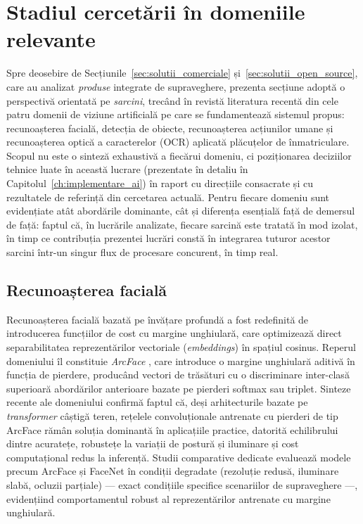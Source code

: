 \documentclass[../../main.tex]{subfiles}
\begin{document}
\section{Stadiul cercetării în domeniile relevante}
\label{sec:stadiul_cercetarii}

Spre deosebire de Secțiunile~\ref{sec:solutii_comerciale} și~\ref{sec:solutii_open_source}, care au analizat \emph{produse} integrate de supraveghere, prezenta secțiune adoptă o perspectivă orientată pe \emph{sarcini}, trecând în revistă literatura recentă din cele patru domenii de viziune artificială pe care se fundamentează sistemul propus: recunoașterea facială, detecția de obiecte, recunoașterea acțiunilor umane și recunoașterea optică a caracterelor (OCR) aplicată plăcuțelor de înmatriculare. Scopul nu este o sinteză exhaustivă a fiecărui domeniu, ci poziționarea deciziilor tehnice luate în această lucrare (prezentate în detaliu în Capitolul~\ref{ch:implementare_ai}) în raport cu direcțiile consacrate și cu rezultatele de referință din cercetarea actuală. Pentru fiecare domeniu sunt evidențiate atât abordările dominante, cât și diferența esențială față de demersul de față: faptul că, în lucrările analizate, fiecare sarcină este tratată în mod izolat, în timp ce contribuția prezentei lucrări constă în integrarea tuturor acestor sarcini într-un singur flux de procesare concurent, în timp real.

\subsection{Recunoașterea facială}
\label{subsec:cercetare_facial}

Recunoașterea facială bazată pe învățare profundă a fost redefinită de introducerea funcțiilor de cost cu margine unghiulară, care optimizează direct separabilitatea reprezentărilor vectoriale (\emph{embeddings}) în spațiul cosinus. Reperul domeniului îl constituie \emph{ArcFace} \cite{arcface2019}, care introduce o margine unghiulară aditivă în funcția de pierdere, producând vectori de trăsături cu o discriminare inter-clasă superioară abordărilor anterioare bazate pe pierderi softmax sau triplet. Sinteze recente ale domeniului \cite{facerec_review2024} confirmă faptul că, deși arhitecturile bazate pe \emph{transformer} câștigă teren, rețelele convoluționale antrenate cu pierderi de tip ArcFace rămân soluția dominantă în aplicațiile practice, datorită echilibrului dintre acuratețe, robustețe la variații de postură și iluminare și cost computațional redus la inferență. Studii comparative dedicate \cite{arcface_facenet2026} evaluează modele precum ArcFace și FaceNet în condiții degradate (rezoluție redusă, iluminare slabă, ocluzii parțiale) --- exact condițiile specifice scenariilor de supraveghere ---, evidențiind comportamentul robust al reprezentărilor antrenate cu margine unghiulară.
\end{document}
